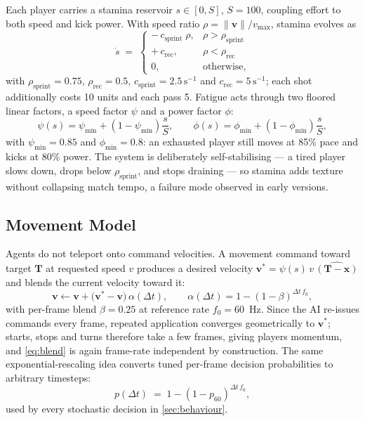 \documentclass[10pt,twocolumn]{article}
\begin{document}
Each player carries a stamina reservoir $s \in [0, S]$, $S=100$, coupling
effort to both speed and kick power. With speed ratio
$\rho = \lVert\mathbf v\rVert / v_{\max}$, stamina evolves as
\begin{equation}\label{eq:stamina}
\dot s \;=\;
\begin{cases}
-\,c_{\text{sprint}}\;\rho, & \rho > \rho_{\text{sprint}} \\
+\,c_{\text{rec}}, & \rho < \rho_{\text{rec}} \\
0, & \text{otherwise,}
\end{cases}
\end{equation}
with $\rho_{\text{sprint}}=0.75$, $\rho_{\text{rec}}=0.5$,
$c_{\text{sprint}}=2.5\,\text{s}^{-1}$ and $c_{\text{rec}}=5\,\text{s}^{-1}$;
each shot additionally costs 10 units and each pass 5. Fatigue acts through
two floored linear factors, a speed factor $\psi$ and a power factor
$\phi$:
\begin{equation}\label{eq:factors}
\psi(s) = \psi_{\min} + (1-\psi_{\min})\frac{s}{S},
\qquad
\phi(s) = \phi_{\min} + (1-\phi_{\min})\frac{s}{S},
\end{equation}
with $\psi_{\min}=0.85$ and $\phi_{\min}=0.8$: an exhausted player still
moves at 85\% pace and kicks at 80\% power. The system is deliberately
self-stabilising --- a tired player slows down, drops below
$\rho_{\text{sprint}}$, and stops draining --- so stamina adds texture
without collapsing match tempo, a failure mode observed in early versions.

\subsection{Movement Model}\label{sec:movement}

Agents do not teleport onto command velocities. A movement command toward
target $\mathbf T$ at requested speed $v$ produces a desired velocity
$\mathbf v^{*} = \psi(s)\,v\,\widehat{(\mathbf T - \mathbf x)}$ and blends
the current velocity toward it:
\begin{equation}\label{eq:blend}
\mathbf v \leftarrow \mathbf v + \bigl(\mathbf v^{*} - \mathbf v\bigr)\,\alpha(\Delta t),
\qquad
\alpha(\Delta t) = 1 - (1-\beta)^{\Delta t\, f_0},
\end{equation}
with per-frame blend $\beta = 0.25$ at reference rate $f_0 = 60$~Hz. Since
the AI re-issues commands every frame, repeated application converges
geometrically to $\mathbf v^{*}$; starts, stops and turns therefore take a
few frames, giving players momentum, and \cref{eq:blend} is again
frame-rate independent by construction. The same exponential-rescaling
idea converts tuned per-frame decision probabilities to arbitrary
timesteps:
\begin{equation}\label{eq:prob}
p(\Delta t) \;=\; 1 - (1 - p_{60})^{\Delta t\, f_0},
\end{equation}
used by every stochastic decision in \cref{sec:behaviour}.
\end{document}
